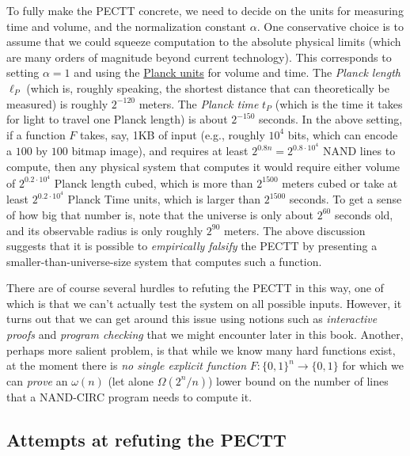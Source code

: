 \begin{remark}
To fully make the PECTT concrete, we need to decide on the units for
measuring time and volume, and the normalization constant \(\alpha\).
One conservative choice is to assume that we could squeeze computation
to the absolute physical limits (which are many orders of magnitude
beyond current technology). This corresponds to setting \(\alpha=1\) and
using the \href{https://goo.gl/gkpmBF}{Planck units} for volume and
time. The \emph{Planck length} \(\ell_P\) (which is, roughly speaking,
the shortest distance that can theoretically be measured) is roughly
\(2^{-120}\) meters. The \emph{Planck time} \(t_P\) (which is the time
it takes for light to travel one Planck length) is about \(2^{-150}\)
seconds. In the above setting, if a function \(F\) takes, say, 1KB of
input (e.g., roughly \(10^4\) bits, which can encode a \(100\) by
\(100\) bitmap image), and requires at least
\(2^{0.8 n}= 2^{0.8 \cdot 10^4}\) NAND lines to compute, then any
physical system that computes it would require either volume of
\(2^{0.2\cdot 10^4}\) Planck length cubed, which is more than
\(2^{1500}\) meters cubed or take at least \(2^{0.2 \cdot 10^4}\) Planck
Time units, which is larger than \(2^{1500}\) seconds. To get a sense of
how big that number is, note that the universe is only about \(2^{60}\)
seconds old, and its observable radius is only roughly \(2^{90}\)
meters. The above discussion suggests that it is possible to
\emph{empirically falsify} the PECTT by presenting a
smaller-than-universe-size system that computes such a function.

There are of course several hurdles to refuting the PECTT in this way,
one of which is that we can't actually test the system on all possible
inputs. However, it turns out that we can get around this issue using
notions such as \emph{interactive proofs} and \emph{program checking}
that we might encounter later in this book. Another, perhaps more
salient problem, is that while we know many hard functions exist, at the
moment there is \emph{no single explicit function}
\(F:\{0,1\}^n \rightarrow \{0,1\}\) for which we can \emph{prove} an
\(\omega(n)\) (let alone \(\Omega(2^n/n)\)) lower bound on the number of
lines that a NAND-CIRC program needs to compute it.

\end{remark}

\subsection{Attempts at refuting the
PECTT}\label{Attempts-at-refuting-the-}

